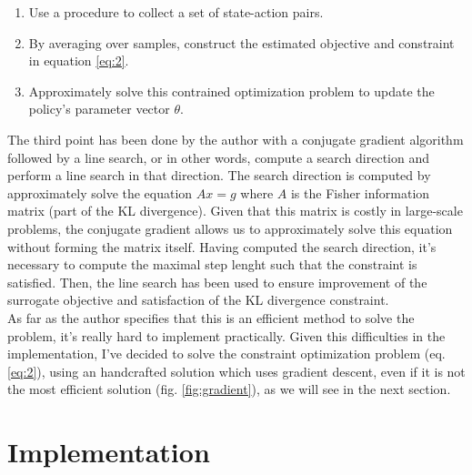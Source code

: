 \documentclass[11pt]{article}
\begin{document}
\begin{enumerate}
        \item Use a procedure to collect a set of state-action pairs.
        \item By averaging over samples, construct the estimated objective and constraint
        in equation \ref{eq:2}.
        \item Approximately solve this contrained optimization problem to update the
        policy's parameter vector $\theta$.

\end{enumerate}
The third point has been done by the author with a conjugate gradient algorithm followed
by a line search, or in other words, compute a search direction and perform a line search
in that direction.
The search direction is computed by approximately solve the equation $Ax = g$ where $A$ is
the Fisher information matrix (part of the KL divergence). Given that this matrix is
costly in large-scale problems, the conjugate gradient allows us to approximately solve
this equation without forming the matrix itself.
Having computed the search direction, it's necessary to compute the maximal step lenght
such that the constraint is satisfied.
Then, the line search has been used to ensure improvement of the surrogate objective and
satisfaction of the KL divergence constraint.
\\
As far as the author specifies that this is an efficient method to solve the problem, it's
really hard to implement practically. Given this difficulties in the implementation, I've
decided to solve the constraint optimization problem (eq. \ref{eq:2}), using an
handcrafted solution which uses gradient descent, even if it is not the most efficient
solution (fig. \ref{fig:gradient}), as we will see in the next section.


\section{Implementation}
\end{document}

